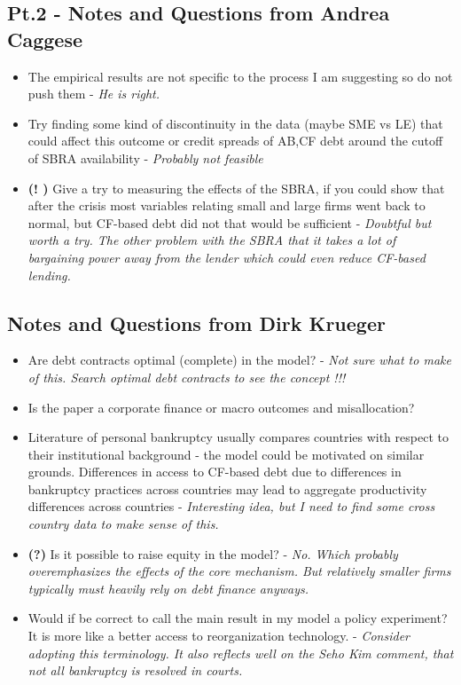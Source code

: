 \documentclass[12pt]{article}
\begin{document}
\subsection*{Pt.2 - Notes and Questions from Andrea Caggese  \checkmark}
\begin{itemize} \setlength\itemsep{0em}  \small
    \item The empirical results are not specific to the process I am suggesting so do not push them - \textit{He is right.}
    \item Try finding some kind of discontinuity in the data (maybe SME vs LE) that could affect this outcome or credit spreads of AB,CF debt around the cutoff of SBRA availability - \textit{Probably not feasible}
    \item \textbf{(! \checkmark)} Give a try to measuring the effects of the SBRA, if you could show that after the crisis most variables relating small and large firms went back to normal, but CF-based debt did not that would be sufficient - \textit{Doubtful but worth a try. The other problem with the SBRA that it takes a lot of bargaining power away from the lender which could even reduce CF-based lending.}
\end{itemize} \normalsize

\subsection*{Notes and Questions from Dirk Krueger}
\begin{itemize} \setlength\itemsep{0em}  \small
    \item Are debt contracts optimal (complete) in the model? - \textit{Not sure what to make of this. Search optimal debt contracts to see the concept !!!}
    \item Is the paper a corporate finance or macro outcomes and misallocation? 
    \item Literature of personal bankruptcy usually compares countries with respect to their institutional background - the model could be motivated on similar grounds. Differences in access to CF-based debt due to differences in bankruptcy practices across countries may lead to aggregate productivity differences across countries - \textit{Interesting idea, but I need to find some cross country data to make sense of this.}
    \item \textbf{(?)} Is it possible to raise equity in the model? - \textit{No. Which probably overemphasizes the effects of the core mechanism. But relatively smaller firms typically must heavily rely on debt finance anyways.}
    \item Would if be correct to call the main result in my model a policy experiment? It is more like a better access to reorganization technology. - \textit{Consider adopting this terminology. It also reflects well on the Seho Kim comment, that not all bankruptcy is resolved in courts.}
\end{itemize} \normalsize
\end{document}
